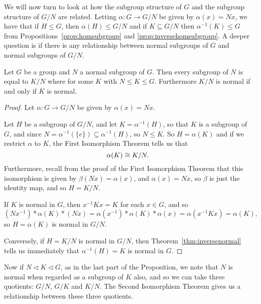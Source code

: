 We will now turn to look at how the subgroup structure of $G$ and the
subgroup structure of $G/N$ are related.  Letting $\alpha: G \to G/N$
be given by $\alpha(x) = Nx$, we have that if $H \le G$, then
$\alpha(H) \le G/N$ and if $K \subseteq G/N$ then $\alpha^{-1}(K) \le
G$ from Propositions~\ref{prop:homsubgroup} and
\ref{prop:inversehomsubgroup}.  A deeper question is if there is any 
relationship between normal subgroups of $G$ and normal subgroups of 
$G/N$.

\begin{proposition}
  Let $G$ be a group and $N$ a normal subgroup of $G$.  Then every
  subgroup of $N$ is equal to $K/N$ where for some $K$ with $N \le K
  \le G$.  Furthermore $K/N$ is normal if and only if $K$ is normal.
\end{proposition}
\begin{proof}
  Let $\alpha: G \to G/N$ be given by $\alpha(x) = Nx$.

  Let $H$ be a subgroup of $G/N$, and let $K = \alpha^{-1}(H)$, so
  that $K$ is a subgroup of $G$, and since $N = \alpha^{-1}(\{e\}) 
  \subseteq \alpha^{-1}(H)$, so $N \le K$.  So $H = \alpha(K)$ and if we
  restrict $\alpha$ to $K$, the First Isomorphism Theorem tells us
  that
  \[
    \alpha(K) \cong K/N.
  \]
  Furthermore, recall from the proof of the First Isomorphism Theorem
  that this isomorphism is given by $\beta(Nx) = \alpha(x)$, and
  $\alpha(x) = Nx$, so $\beta$ is just the identity map, and so $H =
  K/N$.
  
  If $K$ is normal in $G$, then $x^{-1}Kx = K$ for each $x \in G$, and 
  so
  \[
    (Nx^{-1}) \ast \alpha(K) \ast (Nx) = \alpha(x^{-1}) \ast \alpha(K)
    \ast \alpha(x) = \alpha(x^{-1}Kx) = \alpha(K),
  \]
  so $H = \alpha(K)$ is normal in $G/N$.
  
  Conversely, if $H = K/N$ is normal in $G/N$, then
  Theorem~\ref{thm:inversenormal} tells us immediately that
  $\alpha^{-1}(H) = K$ is normal in $G$.
\end{proof}

Now if $N \lhd K \lhd G$, as in the last part of the Proposition, we
note that $N$ is normal when regarded as a subgroup of $K$ also, and
so we can take three quotients: $G/N$, $G/K$ and $K/N$.  The Second 
Isomorphism Theorem gives us a relationship between these three 
quotients.

